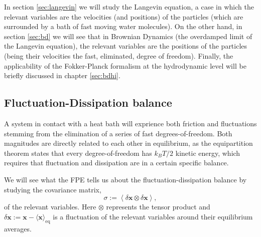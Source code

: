 \documentclass[ twoside,openright,titlepage,numbers=noenddot,%
headinclude,footinclude,cleardoublepage=empty,abstract=on,
BCOR=5mm,paper=a4,fontsize=11pt, dvipsnames
]{scrreprt}
\renewcommand{\vec}[1]{\bm{#1}}
\newcommand{\tens}[1]{\bm{\mathcal{#1}}}
\newcommand{\kT}{k_B T}
\begin{document}
In section \ref{sec:langevin} we will study the Langevin equation, a case in which the relevant variables are the velocities (and positions) of the particles (which are surrounded by a bath of fast moving water molecules). On the other hand, in section \ref{sec:bd} we will see that in Brownian Dynamics (the overdamped limit of the Langevin equation), the relevant variables are the positions of the particles (being their velocities the fast, eliminated, degree of freedom). Finally, the applicability of the Fokker-Planck formalism at the hydrodynamic level will be briefly discussed in chapter \ref{sec:bdhi}.

\subsection{Fluctuation-Dissipation balance}\label{sec:fdb}
A system in contact with a heat bath will exprience both friction and fluctuations stemming from the elimination of a series of fast degrees-of-freedom. Both magnitudes are directly related to each other in equilibrium, as the equipartition theorem states that every degree-of-freedom has $\kT/2$ kinetic energy, which requires that fluctuation and dissipation are in a certain specific balance.

We will see what the \gls{FPE} tells us about the fluctuation-dissipation balance by studying the covariance matrix,
\begin{equation}
\tens{\sigma} :=\left\langle \delta\vec{x}\otimes\delta\vec{x}\right\rangle,
\end{equation}
of the relevant variables. Here $\otimes$ represents the tensor product and $\delta\vec{x} := \vec{x} - \langle\vec{x}\rangle_{\text{eq}}$ is a fluctuation of the relevant variables around their equilibrium averages.
\end{document}
